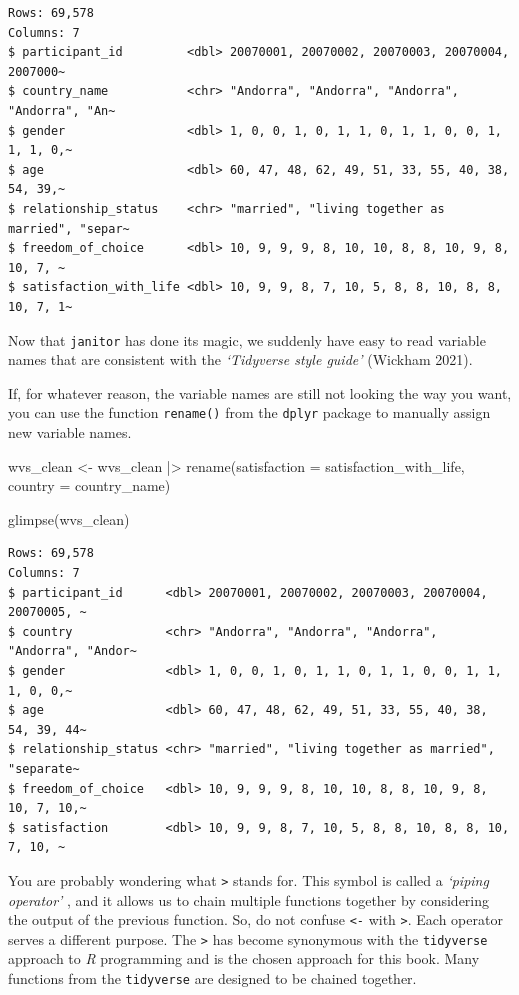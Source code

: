 \documentclass[
  letterpaper,
]{krantz}
\makeatletter
\newenvironment{Shaded}{\begin{snugshade}}{\end{snugshade}}
\newcommand{\AttributeTok}[1]{\textcolor[rgb]{0.40,0.45,0.13}{#1}}
\newcommand{\FunctionTok}[1]{\textcolor[rgb]{0.28,0.35,0.67}{#1}}
\newcommand{\NormalTok}[1]{\textcolor[rgb]{0.00,0.23,0.31}{#1}}
\newcommand{\OtherTok}[1]{\textcolor[rgb]{0.00,0.23,0.31}{#1}}
\newcommand{\SpecialCharTok}[1]{\textcolor[rgb]{0.37,0.37,0.37}{#1}}
\newenvironment{kframe}{%
\medskip{}
\setlength{\fboxsep}{.8em}
 \def\at@end@of@kframe{}%
 \ifinner\ifhmode%
  \def\at@end@of@kframe{\end{minipage}}%
  \begin{minipage}{\columnwidth}%
 \fi\fi%
 \def\FrameCommand##1{\hskip\@totalleftmargin \hskip-\fboxsep
 \colorbox{shadecolor}{##1}\hskip-\fboxsep
     \hskip-\linewidth \hskip-\@totalleftmargin \hskip\columnwidth}%
 \MakeFramed {\advance\hsize-\width
   \@totalleftmargin\z@ \linewidth\hsize
   \@setminipage}}%
 {\par\unskip\endMakeFramed%
 \at@end@of@kframe}
\renewenvironment{Shaded}{\begin{kframe}}{\end{kframe}}
\makeatother
\begin{document}
\begin{verbatim}
Rows: 69,578
Columns: 7
$ participant_id         <dbl> 20070001, 20070002, 20070003, 20070004, 2007000~
$ country_name           <chr> "Andorra", "Andorra", "Andorra", "Andorra", "An~
$ gender                 <dbl> 1, 0, 0, 1, 0, 1, 1, 0, 1, 1, 0, 0, 1, 1, 1, 0,~
$ age                    <dbl> 60, 47, 48, 62, 49, 51, 33, 55, 40, 38, 54, 39,~
$ relationship_status    <chr> "married", "living together as married", "separ~
$ freedom_of_choice      <dbl> 10, 9, 9, 9, 8, 10, 10, 8, 8, 10, 9, 8, 10, 7, ~
$ satisfaction_with_life <dbl> 10, 9, 9, 8, 7, 10, 5, 8, 8, 10, 8, 8, 10, 7, 1~
\end{verbatim}

Now that \texttt{janitor} has done its magic, we suddenly have easy to
read variable names that are consistent with the \emph{`Tidyverse style
guide'} (Wickham 2021).

If, for whatever reason, the variable names are still not looking the
way you want, you can use the function \texttt{rename()} from the
\texttt{dplyr} package to manually assign new variable names.

\begin{Shaded}
\begin{Highlighting}[]
\NormalTok{wvs\_clean }\OtherTok{\textless{}{-}} 
\NormalTok{  wvs\_clean }\SpecialCharTok{|\textgreater{}}
  \FunctionTok{rename}\NormalTok{(}\AttributeTok{satisfaction =}\NormalTok{ satisfaction\_with\_life,}
         \AttributeTok{country =}\NormalTok{ country\_name)}

\FunctionTok{glimpse}\NormalTok{(wvs\_clean)}
\end{Highlighting}
\end{Shaded}

\begin{verbatim}
Rows: 69,578
Columns: 7
$ participant_id      <dbl> 20070001, 20070002, 20070003, 20070004, 20070005, ~
$ country             <chr> "Andorra", "Andorra", "Andorra", "Andorra", "Andor~
$ gender              <dbl> 1, 0, 0, 1, 0, 1, 1, 0, 1, 1, 0, 0, 1, 1, 1, 0, 0,~
$ age                 <dbl> 60, 47, 48, 62, 49, 51, 33, 55, 40, 38, 54, 39, 44~
$ relationship_status <chr> "married", "living together as married", "separate~
$ freedom_of_choice   <dbl> 10, 9, 9, 9, 8, 10, 10, 8, 8, 10, 9, 8, 10, 7, 10,~
$ satisfaction        <dbl> 10, 9, 9, 8, 7, 10, 5, 8, 8, 10, 8, 8, 10, 7, 10, ~
\end{verbatim}

You are probably wondering what \texttt{\textbar{}\textgreater{}} stands
for. This symbol is called a \emph{`piping operator'} , and it allows us
to chain multiple functions together by considering the output of the
previous function. So, do not confuse \texttt{\textless{}-} with
\texttt{\textbar{}\textgreater{}}. Each operator serves a different
purpose. The \texttt{\textbar{}\textgreater{}} has become synonymous
with the \texttt{tidyverse} approach to \emph{R} programming and is the
chosen approach for this book. Many functions from the
\texttt{tidyverse} are designed to be chained together.
\end{document}
